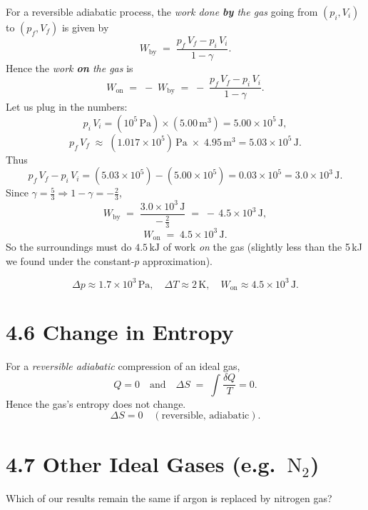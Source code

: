 \documentclass[12pt]{article}
\theoremstyle{definition} %
\theoremstyle{plain} %
\begin{document}
For a reversible adiabatic process, the \emph{work done \textbf{by} the gas} going from \((p_i,V_i)\) to \((p_f,V_f)\) is given by
\[
W_{\text{by}}
\;=\;
\frac{p_f\,V_f - p_i\,V_i}{1-\gamma}.
\]
Hence the \emph{work \textbf{on} the gas} is
\[
W_{\text{on}}
\;=\;
-\;W_{\text{by}}
\;=\;
-\;\frac{p_f\,V_f - p_i\,V_i}{1-\gamma}.
\]
Let us plug in the numbers:
\[
p_i\,V_i = (10^5\,\mathrm{Pa})\times(5.00\,\mathrm{m^3})
=5.00\times10^5\,\mathrm{J},
\]
\[
p_f\,V_f \;\approx\; (1.017\times10^5)\,\mathrm{Pa}\;\times\;4.95\,\mathrm{m^3}
= 5.03\times10^5\,\mathrm{J}.
\]
Thus
\[
p_f\,V_f - p_i\,V_i
= (5.03\times10^5) - (5.00\times10^5)
= 0.03\times10^5
= 3.0\times10^3\,\mathrm{J}.
\]
Since \(\gamma=\tfrac{5}{3}\Rightarrow1-\gamma=-\tfrac{2}{3}\),
\[
W_{\text{by}}
\;=\;
\frac{3.0\times10^3\,\mathrm{J}}{-\,\tfrac{2}{3}}
\;=\;
-\,4.5\times10^3\,\mathrm{J},
\]
\[
W_{\text{on}}
\;=\;
4.5\times10^3\,\mathrm{J}.
\]
So the surroundings must do \(\boxed{4.5\,\mathrm{kJ}}\) of work \emph{on} the gas (slightly less than the 5\,kJ we found under the constant‐\(p\) approximation).

\[
\boxed{
\Delta p \approx 1.7\times10^3\,\mathrm{Pa},
\quad
\Delta T \approx 2\,\mathrm{K},
\quad
W_{\text{on}} \approx 4.5\times10^3\,\mathrm{J}.
}
\]

\section*{4.6 Change in Entropy}

For a \emph{reversible adiabatic} compression of an ideal gas, 
\[
Q=0
\quad\text{and}\quad
\Delta S 
\;=\;\int \frac{\delta Q}{T} = 0.
\]
Hence the gas’s entropy does not change.  
\[
\boxed{\Delta S = 0 \quad (\text{reversible, adiabatic}).}
\]

\section*{4.7 Other Ideal Gases (e.g.\ \texorpdfstring{$\mathrm{N_2}$}{N₂})}

Which of our results remain the same if argon is replaced by nitrogen gas?
\end{document}
